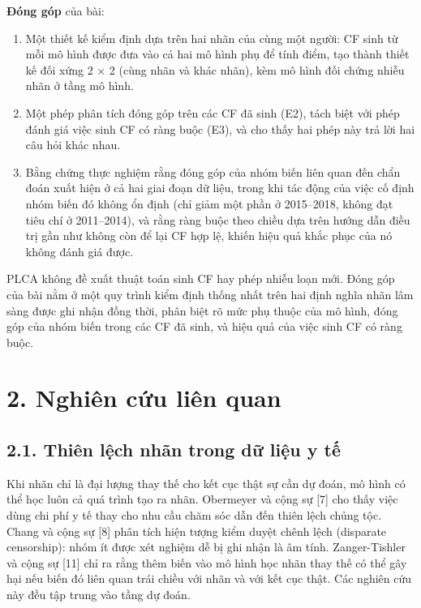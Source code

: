 \documentclass[9pt,a4paper]{extarticle}
\providecommand{\tightlist}{\setlength{\itemsep}{0pt}\setlength{\parskip}{0pt}}
\begin{document}
\textbf{Đóng góp} của bài:

\begin{enumerate}
\def\labelenumi{\arabic{enumi}.}
\tightlist
\item
  Một thiết kế kiểm định dựa trên hai nhãn của cùng một người: CF sinh
  từ mỗi mô hình được đưa vào cả hai mô hình phụ để tính điểm, tạo thành
  thiết kế đối xứng 2 × 2 (cùng nhãn và khác nhãn), kèm mô hình đối
  chứng nhiễu nhãn ở tầng mô hình.
\item
  Một phép phân tích đóng góp trên các CF đã sinh (E2), tách biệt với
  phép đánh giá việc sinh CF có ràng buộc (E3), và cho thấy hai phép này
  trả lời hai câu hỏi khác nhau.
\item
  Bằng chứng thực nghiệm rằng đóng góp của nhóm biến liên quan đến chẩn
  đoán xuất hiện ở cả hai giai đoạn dữ liệu, trong khi tác động của việc
  cố định nhóm biến đó không ổn định (chỉ giảm một phần ở 2015--2018,
  không đạt tiêu chí ở 2011--2014), và rằng ràng buộc theo chiều dựa
  trên hướng dẫn điều trị gần như không còn để lại CF hợp lệ, khiến hiệu
  quả khắc phục của nó không đánh giá được.
\end{enumerate}

PLCA không đề xuất thuật toán sinh CF hay phép nhiễu loạn mới. Đóng góp
của bài nằm ở một quy trình kiểm định thống nhất trên hai định nghĩa
nhãn lâm sàng được ghi nhận đồng thời, phân biệt rõ mức phụ thuộc của mô
hình, đóng góp của nhóm biến trong các CF đã sinh, và hiệu quả của việc
sinh CF có ràng buộc.

\section{2. Nghiên cứu liên quan}

\subsection{2.1. Thiên lệch nhãn trong dữ liệu y tế}

Khi nhãn chỉ là đại lượng thay thế cho kết cục thật sự cần dự đoán, mô
hình có thể học luôn cả quá trình tạo ra nhãn. Obermeyer và cộng sự
{[}7{]} cho thấy việc dùng chi phí y tế thay cho nhu cầu chăm sóc dẫn
đến thiên lệch chủng tộc. Chang và cộng sự {[}8{]} phân tích hiện tượng
kiểm duyệt chênh lệch (disparate censorship): nhóm ít được xét nghiệm dễ
bị ghi nhận là âm tính. Zanger-Tishler và cộng sự {[}11{]} chỉ ra rằng
thêm biến vào mô hình học nhãn thay thế có thể gây hại nếu biến đó liên
quan trái chiều với nhãn và với kết cục thật. Các nghiên cứu này đều tập
trung vào tầng dự đoán.
\end{document}
